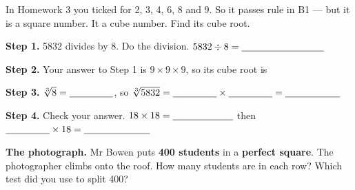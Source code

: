 \documentclass[12pt,a4paper]{article}
\begin{document}

\begin{yourturn}
  In Homework 3 you ticked  for 2, 3, 4, 6, 8 and 9. So it passes
   rule in B1 --- but it is  a square number. It  a
  cube number. Find its cube root.
\end{yourturn}

\noindent\textbf{Step 1.} 5832 divides by 8. Do the division.
\quad $5832 \div 8 = \blank[3.0cm]$

\vspace{6pt}
\noindent\textbf{Step 2.} Your answer to Step 1 is $9 \times 9 \times 9$, so its
cube root is \blank[2.2cm]

\vspace{6pt}
\noindent\textbf{Step 3.} $\sqrt[3]{8} = \blank[1.6cm]$, so
$\sqrt[3]{5832} = \blank[1.6cm] \times \blank[1.6cm] = \blank[2.0cm]$

\vspace{6pt}
\noindent\textbf{Step 4.} Check your answer.
\quad $18 \times 18 = \blank[2.2cm]$ \quad then \quad
$\blank[1.6cm] \times 18 = \blank[2.4cm]$


\noindent\textbf{The photograph.} Mr Bowen puts \textbf{400 students} in a
\textbf{perfect square}. The photographer climbs onto the roof. How many students
are in each row? Which test did you use to split 400?
\end{document}
